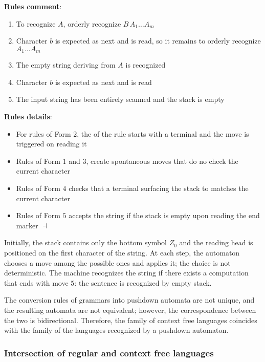 \documentclass[english]{article}
\begin{document}
\bigskip
\textbf{Rules comment}:
\begin{enumerate}[label=\textbf{\#\arabic*.}, leftmargin=3em]
  \item To recognize \(A\), orderly recognize \(B \, A_1 \ldots A_m\)
  \item Character \(b\) is expected as next and is read, so it remains to orderly recognize \(A_1 \ldots A_m\)
  \item The empty string deriving from \(A\) is recognized
  \item Character \(b\) is expected as next and is read
  \item The input string has been entirely scanned and the stack is empty
\end{enumerate}
\bigskip
\textbf{Rules details}:
\begin{itemize}
  \item For rules of Form \(2\), the \RP of the rule starts with a terminal and the move is triggered on reading it
  \item Rules of Form \(1\) and \(3\), create spontaneous moves that do no check the current character
  \item Rules of Form \(4\) checks that a terminal surfacing the stack to matches the current character
  \item Rules of Form \(5\) accepts the string if the stack is empty upon reading the end marker \(\dashv\)
\end{itemize}

Initially, the stack contains only the bottom symbol \(Z_0\) and the reading head is positioned on the first character of the string.
At each step, the automaton chooses a move among the possible ones and applies it; the choice is not deterministic.
The machine recognizes the string if there exists a computation that ends with move \(5\): the sentence is recognized by empty stack.

The conversion rules of grammars into pushdown automata are not unique, and the resulting automata are not equivalent;
however, the correspondence between the two is bidirectional.
Therefore, the family of context free languages \CF coincides with the family of the languages recognized by a pushdown automaton.

\subsubsection{Intersection of regular and context free languages}
\label{sec:intersection-of-regular-and-context-free-languages}
\end{document}
